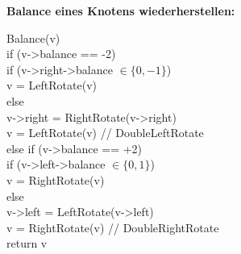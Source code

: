 \begin{sectionbox}
    \textbf{Balance eines Knotens wiederherstellen:}\\
    \begin{sectionbox}
        \t{ Balance(v)\\
            if (v->balance == -2)\\
            \hspace*{1em} if (v->right->balance $\in \{0, -1\}$)\\
            \hspace*{2em}   v = LeftRotate(v)\\
            \hspace*{1em} else\\
            \hspace*{2em}   v->right = RightRotate(v->right)\\
            \hspace*{2em}   v = LeftRotate(v) // DoubleLeftRotate\\
            else if (v->balance == +2)\\
            \hspace*{1em} if (v->left->balance $\in \{0, 1\}$)\\
            \hspace*{2em}   v = RightRotate(v)\\
            \hspace*{1em} else\\
            \hspace*{2em}   v->left = LeftRotate(v->left)\\
            \hspace*{2em}   v = RightRotate(v) // DoubleRightRotate\\
            return v
        }
    \end{sectionbox}
\end{sectionbox}


